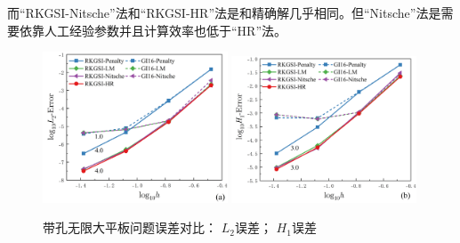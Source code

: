 而“RKGSI-Nitsche”法和“RKGSI-HR”法是和精确解几乎相同。但“Nitsche”法是需要依靠人工经验参数并且计算效率也低于“HR”法。
\newpage
\begin{figure}[H]
\centering
\begin{subcaptiongroup}
        \includegraphics[width=0.49\textwidth]{figure/EHR/hole/L2.png}
        \label{EHL2}
        \includegraphics[width=0.49\textwidth]{figure/EHR/hole/H1.png}
        \label{EHH1}
        \end{subcaptiongroup}
    \caption{带孔无限大平板问题误差对比： $L_2$误差； $H_1$误差}
    \label{EHLH}
    \end{figure}
